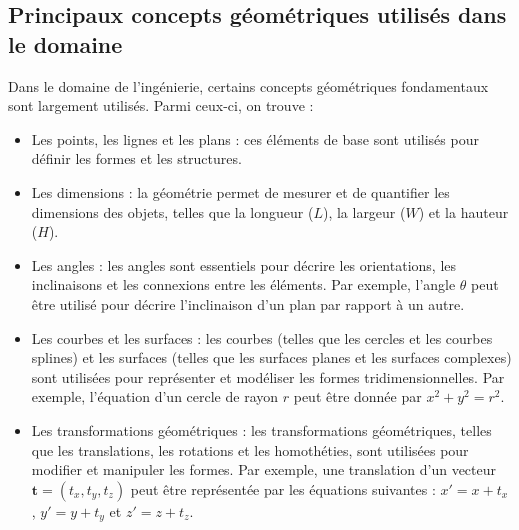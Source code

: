\documentclass{article}
\begin{document}
\subsection{Principaux concepts géométriques utilisés dans le domaine}
Dans le domaine de l'ingénierie, certains concepts géométriques fondamentaux sont largement utilisés. Parmi ceux-ci, on trouve :
\begin{itemize}
  \item Les points, les lignes et les plans : ces éléments de base sont utilisés pour définir les formes et les structures.

  \item Les dimensions : la géométrie permet de mesurer et de quantifier les dimensions des objets, telles que la longueur ($L$), la largeur ($W$) et la hauteur ($H$).

  \item Les angles : les angles sont essentiels pour décrire les orientations, les inclinaisons et les connexions entre les éléments. Par exemple, l'angle $\theta$ peut être utilisé pour décrire l'inclinaison d'un plan par rapport à un autre.

  \item Les courbes et les surfaces : les courbes (telles que les cercles et les courbes splines) et les surfaces (telles que les surfaces planes et les surfaces complexes) sont utilisées pour représenter et modéliser les formes tridimensionnelles. Par exemple, l'équation d'un cercle de rayon $r$ peut être donnée par $x^2 + y^2 = r^2$.

  \item Les transformations géométriques : les transformations géométriques, telles que les translations, les rotations et les homothéties, sont utilisées pour modifier et manipuler les formes. Par exemple, une translation d'un vecteur $\mathbf{t} = (t_x, t_y, t_z)$ peut être représentée par les équations suivantes : $x' = x + t_x$, $y' = y + t_y$ et $z' = z + t_z$.
\end{itemize}
\end{document}
